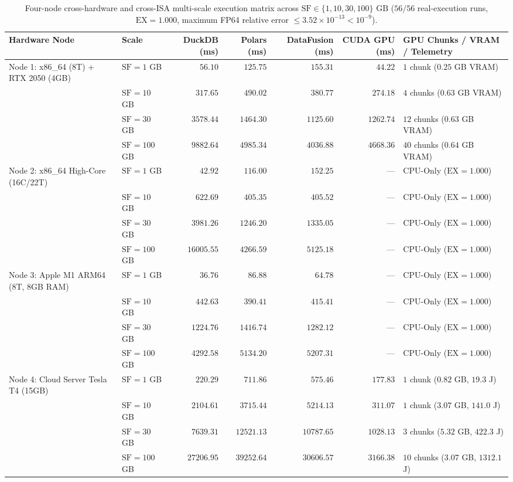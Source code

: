\documentclass[10pt,a4paper]{article}
\begin{document}
\begin{table}[htbp]
\centering\scriptsize\setlength{\tabcolsep}{3.8pt}
\caption{Four-node cross-hardware and cross-ISA multi-scale execution matrix across $\text{SF} \in \{1, 10, 30, 100\}\text{ GB}$ ($56/56$ real-execution runs, $\text{EX}=1.000$, maximum FP64 relative error $\le 3.52 \times 10^{-13} < 10^{-9}$).}
\label{tab:v10_fournode_multiscale}
\begin{tabular}{@{}llrrrrl@{}}
\toprule
\textbf{Hardware Node} & \textbf{Scale} & \textbf{DuckDB (ms)} & \textbf{Polars (ms)} & \textbf{DataFusion (ms)} & \textbf{CUDA GPU (ms)} & \textbf{GPU Chunks / VRAM / Telemetry} \\
\midrule
Node 1: x86\_64 (8T) + RTX 2050 (4GB) & $\text{SF}=1$ GB & $56.10$ & $125.75$ & $155.31$ & $44.22$ & $1$ chunk ($0.25$ GB VRAM) \\
 & $\text{SF}=10$ GB & $317.65$ & $490.02$ & $380.77$ & $274.18$ & $4$ chunks ($0.63$ GB VRAM) \\
 & $\text{SF}=30$ GB & $3578.44$ & $1464.30$ & $1125.60$ & $1262.74$ & $12$ chunks ($0.63$ GB VRAM) \\
 & $\text{SF}=100$ GB & $9882.64$ & $4985.34$ & $4036.88$ & $4668.36$ & $40$ chunks ($0.64$ GB VRAM) \\
\midrule
Node 2: x86\_64 High-Core (16C/22T) & $\text{SF}=1$ GB & $42.92$ & $116.00$ & $152.25$ & --- & CPU-Only ($\text{EX}=1.000$) \\
 & $\text{SF}=10$ GB & $622.69$ & $405.35$ & $405.52$ & --- & CPU-Only ($\text{EX}=1.000$) \\
 & $\text{SF}=30$ GB & $3981.26$ & $1246.20$ & $1335.05$ & --- & CPU-Only ($\text{EX}=1.000$) \\
 & $\text{SF}=100$ GB & $16005.55$ & $4266.59$ & $5125.18$ & --- & CPU-Only ($\text{EX}=1.000$) \\
\midrule
Node 3: Apple M1 ARM64 (8T, 8GB RAM) & $\text{SF}=1$ GB & $36.76$ & $86.88$ & $64.78$ & --- & CPU-Only ($\text{EX}=1.000$) \\
 & $\text{SF}=10$ GB & $442.63$ & $390.41$ & $415.41$ & --- & CPU-Only ($\text{EX}=1.000$) \\
 & $\text{SF}=30$ GB & $1224.76$ & $1416.74$ & $1282.12$ & --- & CPU-Only ($\text{EX}=1.000$) \\
 & $\text{SF}=100$ GB & $4292.58$ & $5134.20$ & $5207.31$ & --- & CPU-Only ($\text{EX}=1.000$) \\
\midrule
Node 4: Cloud Server Tesla T4 (15GB) & $\text{SF}=1$ GB & $220.29$ & $711.86$ & $575.46$ & $177.83$ & $1$ chunk ($0.82$ GB, $19.3$ J) \\
 & $\text{SF}=10$ GB & $2104.61$ & $3715.44$ & $5214.13$ & $311.07$ & $1$ chunk ($3.07$ GB, $141.0$ J) \\
 & $\text{SF}=30$ GB & $7639.31$ & $12521.13$ & $10787.65$ & $1028.13$ & $3$ chunks ($5.32$ GB, $422.3$ J) \\
 & $\text{SF}=100$ GB & $27206.95$ & $39252.64$ & $30606.57$ & $3166.38$ & $10$ chunks ($3.07$ GB, $1312.1$ J) \\
\bottomrule
\end{tabular}
\end{table}
\end{document}
